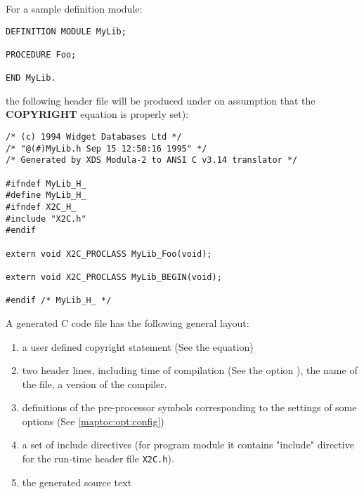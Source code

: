 For a sample definition module:
\begin{verbatim}
DEFINITION MODULE MyLib;

PROCEDURE Foo;

END MyLib.
\end{verbatim}
the following header file will be produced under on assumption
that the {\bf COPYRIGHT} equation is properly set):
{\small
\begin{verbatim}
/* (c) 1994 Widget Databases Ltd */
/* "@(#)MyLib.h Sep 15 12:50:16 1995" */
/* Generated by XDS Modula-2 to ANSI C v3.14 translator */

#ifndef MyLib_H_
#define MyLib_H_
#ifndef X2C_H_
#include "X2C.h"
#endif

extern void X2C_PROCLASS MyLib_Foo(void);

extern void X2C_PROCLASS MyLib_BEGIN(void);

#endif /* MyLib_H_ */
\end{verbatim}
}

\noindent
A generated C code file  has  the
following general layout:
\begin{enumerate}
\item   a user defined copyright statement (See the 
        equation)

\item   two header lines, including time of compilation
        (See the option ),
        the name of the file, a version of the \xds{} compiler.

\item   definitions of the pre-processor symbols corresponding
        to the settings of some options (See \ref{maptoc:opt:config})

\item   a set of include directives (for program module it contains
        "include" directive for the run-time header file {\tt X2C.h}).

\item   the generated source text

\end{enumerate}

